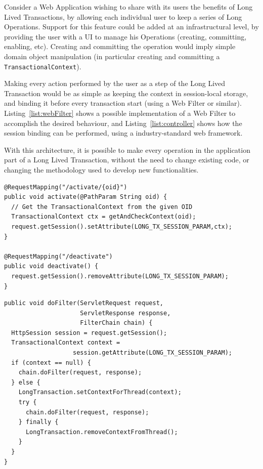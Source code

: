 \documentclass{llncs}
\begin{document}
Consider a Web Application wishing to share with its users the
benefits of Long Lived Transactions, by allowing each individual user
to keep a series of Long Operations. Support for this feature could be
added at an infrastructural level, by providing the user with a UI to
manage his Operations (creating, committing, enabling, etc). Creating
and committing the operation would imply simple domain object
manipulation (in particular creating and committing a
\texttt{TransactionalContext}).

Making every action performed by the user as a step of the Long Lived
Transaction would be as simple as keeping the context in session-local
storage, and binding it before every transaction start (using a Web
Filter or similar). Listing~\ref{list:webFilter} shows a possible
implementation of a Web Filter to accomplish the desired behaviour,
and Listing~\ref{list:controller} shows how the session binding can be
performed, using a industry-standard web framework.

With this architecture, it is possible to make every operation in the
application part of a Long Lived Transaction, without the need to
change existing code, or changing the methodology used to develop new
functionalities.

\begin{lstlisting}[caption={Controller methods to associate a
    TransactionalContext with a user's session},label={list:controller},float]
@RequestMapping("/activate/{oid}")
public void activate(@PathParam String oid) {
  // Get the TransactionalContext from the given OID
  TransactionalContext ctx = getAndCheckContext(oid);
  request.getSession().setAttribute(LONG_TX_SESSION_PARAM,ctx);
}

@RequestMapping("/deactivate")
public void deactivate() {
  request.getSession().removeAttribute(LONG_TX_SESSION_PARAM);
}
\end{lstlisting}

\begin{lstlisting}[caption={Web Filter to wrap every transaction in a
    TransactionalContext},label={list:webFilter},float]
public void doFilter(ServletRequest request, 
                     ServletResponse response,
                     FilterChain chain) {
  HttpSession session = request.getSession();
  TransactionalContext context = 
                   session.getAttribute(LONG_TX_SESSION_PARAM);
  if (context == null) {
    chain.doFilter(request, response);
  } else {
    LongTransaction.setContextForThread(context);
    try {
      chain.doFilter(request, response);
    } finally {
      LongTransaction.removeContextFromThread();
    }
  }
}
\end{lstlisting}
\end{document}
